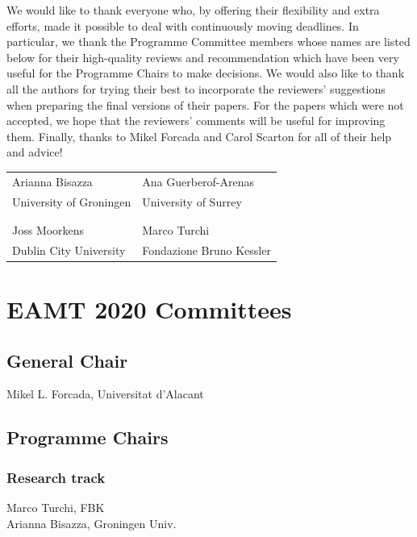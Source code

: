 \documentclass[a4paper,11pt,twoside]{book}
\begin{document}
We would like to thank everyone who, by offering their flexibility and extra efforts, made it possible to deal with continuously moving deadlines. In particular, we thank the Programme Committee members whose names are listed below for their high-quality reviews and recommendation which have been very useful for the Programme Chairs to make decisions. We would also like to thank all the authors for trying their best to incorporate the reviewers’ suggestions when preparing the final versions of their papers. For the papers which were not accepted, we hope that the reviewers’ comments will be useful for improving them. Finally, thanks to Mikel Forcada and Carol Scarton for all of their help and advice!

\vspace{1cm}
\begin{center}
\begin{tabular}{ll}
Arianna Bisazza 		& Ana Guerberof-Arenas\\
University of Groningen	& University of Surrey \\
\\
\\
Joss Moorkens			& Marco Turchi\\
Dublin City University	& Fondazione Bruno Kessler\\
\end{tabular}

\end{center}


\chapter*{EAMT 2020 Committees}

\section*{General Chair}
\noindent Mikel L. Forcada, Universitat d’Alacant


\section*{Programme Chairs}
\subsection*{Research track}
\noindent Marco Turchi, FBK\\
\noindent Arianna Bisazza, Groningen Univ.
\end{document}
